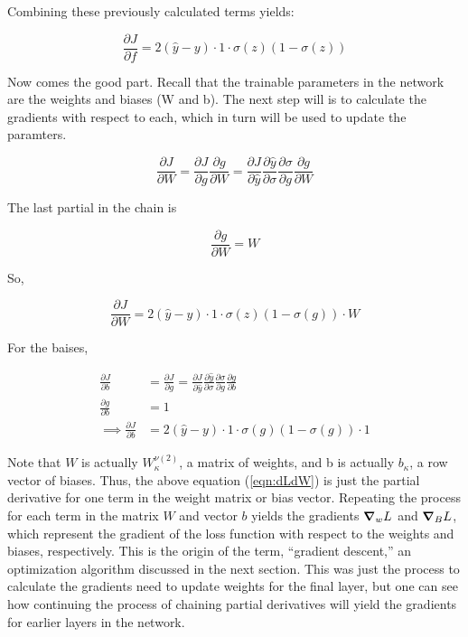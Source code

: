 \noindent Combining these previously calculated terms yields:

\begin{equation}
\frac{\partial J}{\partial f} = 2(\hat{y} - y ) \cdot 1 \cdot  \sigma(z)(1 - \sigma(z))
\end{equation}

Now comes the good part. Recall that the trainable parameters in the network are the weights and biases (W and b). The next step will is to calculate the gradients with respect to each, which in turn will be used to update the paramters.

\begin{equation}
\frac{\partial J}{\partial W} = \frac{\partial J}{\partial g}\frac{\partial g}{\partial W} = \frac{\partial J}{\partial \hat{y}} \frac{\partial \hat{y}}{\partial \sigma} \frac{\partial \sigma}{\partial g} \frac{\partial g}{\partial W}
\end{equation}

\noindent The last partial in the chain is

\begin{equation}
\frac{\partial g}{\partial W} = W
\end{equation}


\noindent So,

\begin{equation}
\frac{\partial J}{\partial W} = 2(\hat{y} - y ) \cdot 1 \cdot  \sigma(z)(1 - \sigma(g)) \cdot W
\end{equation}

\noindent For the baises,

\begin{align}
\label{eqn:dLdW}
\frac{\partial J}{\partial b} &= \frac{\partial J}{\partial g} = \frac{\partial J}{\partial \hat{y}} \frac{\partial \hat{y}}{\partial \sigma} \frac{\partial \sigma}{\partial g} \frac{\partial g}{\partial b} \\
\frac{\partial g}{\partial b} &= 1 \\
\implies \frac{\partial J}{\partial b} &= 2(\hat{y} - y ) \cdot 1 \cdot  \sigma(g)(1 - \sigma(g)) \cdot 1
\end{align}

Note that $ W $ is actually $ W_\kappa ^{\nu (2)} $, a matrix of weights, and b is actually $ b_\kappa $, a row vector of biases. Thus, the above equation (\ref{eqn:dLdW}) is just the partial derivative for one term in the weight matrix or bias vector. Repeating the process for each term in the matrix $ W $  and vector $ b $  yields the gradients $ \grad_w L $  and $ \grad_B L $, which represent the gradient of the loss function with respect to the weights and biases, respectively. This is the origin of the term, ``gradient descent,'' an optimization algorithm discussed in the next section. This was just the process to calculate the gradients need to update weights for the final layer, but one can see how continuing the process of chaining partial derivatives will yield the gradients for earlier layers in the network.

